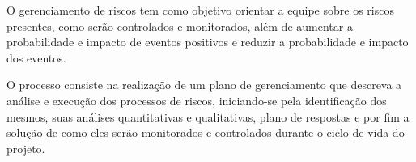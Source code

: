O gerenciamento de riscos tem como objetivo orientar a equipe sobre os riscos presentes, como serão controlados e monitorados, além de aumentar a probabilidade e impacto de eventos positivos e reduzir a probabilidade e impacto dos eventos.

O processo consiste na realização de um plano de gerenciamento que descreva a análise e execução dos processos de riscos, iniciando-se pela identificação dos mesmos, suas análises quantitativas e qualitativas, plano de respostas e por fim a solução de como eles serão monitorados e controlados durante o ciclo de vida do projeto.



